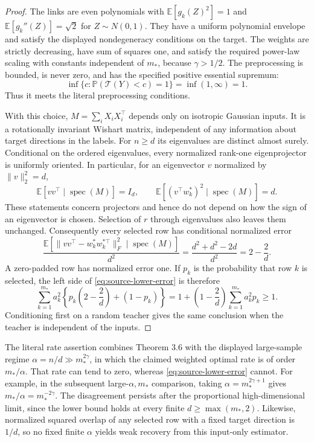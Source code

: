 \begin{proof}
The links are even polynomials with
$\mathbb E[g_k(Z)^2]=1$ and
$\mathbb E[g_k''(Z)]=\sqrt2$ for $Z\sim N(0,1)$.
They have a uniform polynomial envelope and satisfy the displayed
nondegeneracy conditions on the target. The weights are strictly
decreasing, have sum of squares one, and satisfy the required power-law
scaling with constants independent of $m_*$, because $\gamma>1/2$.
The preprocessing is bounded, is never zero, and has the specified
positive essential supremum:
\[
 \inf\{c:\mathbb P(\mathcal T(Y)<c)=1\}
 =\inf(1,\infty)=1.
\]
Thus it meets the literal preprocessing conditions.

With this choice, $M=\sum_iX_iX_i^\top$ depends only on isotropic
Gaussian inputs. It is a rotationally invariant Wishart matrix,
independent of any information about target directions in the labels.
For $n\geq d$ its eigenvalues are distinct almost surely. Conditional on
the ordered eigenvalues, every normalized rank-one eigenprojector is
uniformly oriented. In particular, for an eigenvector $v$ normalized by
$\|v\|_2^2=d$,
\[
 \mathbb E[vv^\top\mid\operatorname{spec}(M)]=I_d,
 \qquad
 \mathbb E[(v^\top w_k^*)^2\mid\operatorname{spec}(M)]=d.
\]
These statements concern projectors and hence do not depend on how the
sign of an eigenvector is chosen. Selection of $r$ through eigenvalues
also leaves them unchanged. Consequently every selected row has
conditional normalized error
\[
 \frac{\mathbb E[\|vv^\top-w_k^*w_k^{*\top}\|_F^2
              \mid\operatorname{spec}(M)]}{d^2}
 =\frac{d^2+d^2-2d}{d^2}=2-\frac2d.
\]
A zero-padded row has normalized error one. If $p_k$ is the probability
that row $k$ is selected, the left side of
\eqref{eq:source-lower-error} is therefore
\[
 \sum_{k=1}^{m_*}a_k^2
       \left\{p_k\left(2-\frac2d\right)+(1-p_k)\right\}
 =1+\left(1-\frac2d\right)\sum_{k=1}^{m_*}a_k^2p_k\geq1.
\]
Conditioning first on a random teacher gives the same conclusion when
the teacher is independent of the inputs.
\end{proof}

The literal rate assertion combines Theorem 3.6 with the displayed
large-sample regime $\alpha=n/d\gg m_*^{2\gamma}$, in which the claimed
weighted optimal rate is of order $m_*/\alpha$. That rate can tend to
zero, whereas \eqref{eq:source-lower-error} cannot. For example, in the
subsequent large-$\alpha,m_*$ comparison, taking
$\alpha=m_*^{2\gamma+1}$ gives $m_*/\alpha=m_*^{-2\gamma}$.
The disagreement persists after the proportional high-dimensional limit,
since the lower bound holds at every finite $d\geq\max(m_*,2)$.
Likewise, normalized squared overlap of any selected row with a fixed
target direction is $1/d$, so no fixed finite $\alpha$ yields weak
recovery from this input-only estimator.

